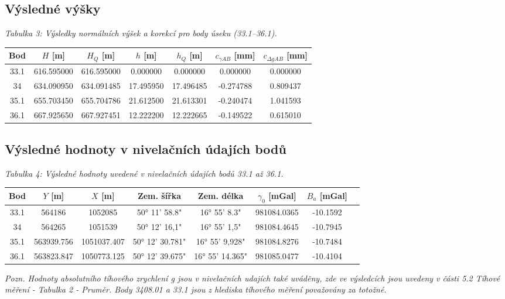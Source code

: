 \hspace{1 cm}

\subsection{Výsledné výšky}

\begin{table}[H]
  \centering
  \textit{Tabulka 3: Výsledky normálních výšek a korekcí pro body úseku (33.1–36.1).}
  \begin{tabular}{|c|c|c|c|c|c|c|}
    \hline
    \textbf{Bod} & \textbf{\(H\) [m]} & \textbf{\(H_Q\) [m]} & \textbf{\(h\) [m]} & \textbf{\(h_Q\) [m]} & \textbf{\(c_{\gamma AB}\) [mm]} & \textbf{\(c_{\Delta g AB}\) [mm]} \\
    \hline\hline
    33.1 & 616.595000 & 616.595000 & 0.000000 & 0.000000 &  0.000000 & 0.000000 \\
    34 & 634.090950 & 634.091485 & 17.495950 & 17.496485 & -0.274788 & 0.809437 \\
    35.1 & 655.703450 & 655.704786 & 21.612500 & 21.613301 & -0.240474 & 1.041593 \\
    36.1 & 667.925650 & 667.927451 & 12.222200 & 12.222665 & -0.149522 & 0.615010 \\
    \hline
  \end{tabular}
  \label{tab:norm_vysky_33_36}
\end{table}

\subsection{Výsledné hodnoty v nivelačních údajích bodů}

\begin{table}[H]
  \centering
  \textit{Tabulka 4: Výsledné hodnoty uvedené v nivelačních údajích bodů 33.1 až 36.1.}
  \begin{tabular}{|c|c|c|c|c|c|c|c|}
    \hline
    \textbf{Bod} & \textbf{\(Y\) [m]} & \textbf{\(X\) [m]} & \textbf{Zem. šířka} & \textbf{Zem. délka} & \textbf{\(\gamma_0\) [mGal]} & \textbf{\(B_a\) [mGal]} \\
    \hline\hline
    33.1 & 564186 & 1052085 & 50° 11' 58.8" & 16° 55' 8.3" & 981084.0365 & -10.1592 \\
    34   & 564265 & 1051539 & 50° 12' 16,1" & 16° 55' 1,5" & 981084.4645 & -10.7945 \\
    35.1 & 563939.756 & 1051037.407 & 50° 12' 30.781" & 16° 55' 9,928" & 981084.8276 & -10.7484 \\
    36.1 & 563823.847 & 1050773.125 & 50° 12' 39.675" & 16° 55' 14.365" & 981085.0477 & -10.4104 \\
    \hline
  \end{tabular}
  \label{tab:niv_udaje}
\end{table}

\textit{Pozn. Hodnoty absolutního tíhového zrychlení g jsou v nivelačních udajích také uváděny, zde ve výsledcích jsou uvedeny v části 5.2 Tíhové měření - Tabulka 2 - Pruměr. Body 3408.01 a 33.1 jsou z hlediska tíhového měření považovány za totožné.}